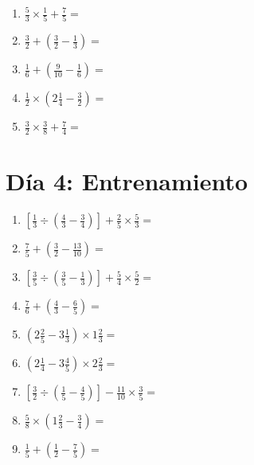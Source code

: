 \documentclass[12pt]{article}
\begin{document}
\begin{enumerate}[ itemsep=1.5cm]
	\item $\displaystyle \frac{5}{3} \times \frac{1}{5} + \frac{7}{5} =$
	\item $\displaystyle \frac{3}{2} + \left( \frac{3}{2} - \frac{1}{3} \right) =$
	\item $\displaystyle \frac{1}{6} + \left( \frac{9}{10} - \frac{1}{6} \right) =$
	\item $\displaystyle \frac{1}{2} \times \left( 2 \frac{1}{4} - \frac{3}{2} \right) =$
	\item $\displaystyle \frac{3}{2} \times \frac{3}{8} + \frac{7}{4} =$
\end{enumerate}
\section*{Día 4: Entrenamiento}
\begin{enumerate}[ itemsep=1.5cm]
	\item $\displaystyle \left[ \frac{1}{3} \div \left( \frac{4}{3} - \frac{3}{4} \right) \right] + \frac{2}{5} \times \frac{5}{3} =$
	\item $\displaystyle \frac{7}{5} + \left( \frac{3}{2} - \frac{13}{10} \right) =$
	\item $\displaystyle \left[ \frac{3}{5} \div \left( \frac{3}{5} - \frac{1}{3} \right) \right] + \frac{5}{4} \times \frac{5}{2} =$
	\item $\displaystyle \frac{7}{6} + \left( \frac{4}{3} - \frac{6}{5} \right) =$
	\item $\displaystyle \left( 2 \frac{2}{5} - 3 \frac{1}{3} \right) \times 1 \frac{2}{3} =$
	\item $\displaystyle \left( 2 \frac{1}{4} - 3 \frac{4}{5} \right) \times 2 \frac{2}{3} =$
	\item $\displaystyle \left[ \frac{3}{2} \div \left( \frac{1}{5} - \frac{4}{5} \right) \right] - \frac{11}{10} \times \frac{3}{5} =$
	\item $\displaystyle \frac{5}{8} \times \left( 1 \frac{2}{3} - \frac{3}{4} \right) =$
	\item $\displaystyle \frac{1}{5} + \left( \frac{1}{2} - \frac{7}{5} \right) =$


\end{enumerate}
\end{document}
